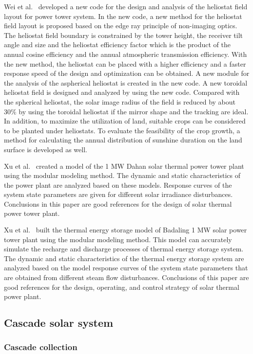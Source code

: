 Wei et al.~\cite{Wei2010a} developed a new code for the design and analysis of the heliostat field layout for power tower system. In the new code, a new method for the heliostat field layout is proposed based on the edge ray principle of non-imaging optics. The heliostat field boundary is constrained by the tower height, the receiver tilt angle and size and the heliostat efficiency factor which is the product of the annual cosine efficiency and the annual atmospheric transmission efficiency. With the new method, the heliostat can be placed with a higher efficiency and a faster response speed of the design and optimization can be obtained. A new module for the analysis of the aspherical heliostat is created in the new code. A new toroidal heliostat field is designed and analyzed by using the new code. Compared with the spherical heliostat, the solar image radius of the field is reduced by about 30\% by using the toroidal heliostat if the mirror shape and the tracking are ideal. In addition, to maximize the utilization of land, suitable crops can be considered to be planted under heliostats. To evaluate the feasibility of the crop growth, a method for calculating the annual distribution of sunshine duration on the land surface is developed as well.

Xu et al.~\cite{Xu2011a} created a model of the 1 MW Dahan solar thermal power tower plant using the modular modeling method. The dynamic and static characteristics of the power plant are analyzed based on these models. Response curves of the system state parameters are given for different solar irradiance disturbances. Conclusions in this paper are good references for the design of solar thermal power tower plant.

Xu et al.~\cite{Xu2012} built the thermal energy storage model of Badaling 1 MW solar power tower plant using the modular modeling method. This model can accurately simulate the recharge and discharge processes of thermal energy storage system. The dynamic and static characteristics of the thermal energy storage system are analyzed based on the model response curves of the system state parameters that are obtained from different steam flow disturbances. Conclusions of this paper are good references for the design, operating, and control strategy of solar thermal power plant.

\subsection{Cascade solar system}\label{sec:cs}
\subsubsection{Cascade collection}

